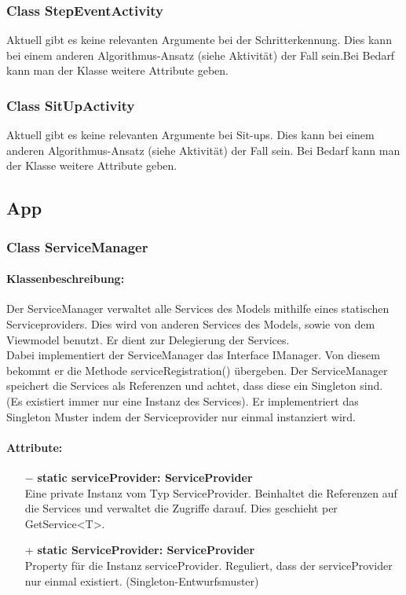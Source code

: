 \documentclass[a4paper,12pt]{article}
\begin{document}
	\subsubsection{Class StepEventActivity}
	Aktuell gibt es keine relevanten Argumente bei der Schritterkennung. Dies kann bei einem anderen Algorithmus-Ansatz (siehe Aktivität) der Fall sein.Bei Bedarf kann man der Klasse weitere Attribute geben.
	\subsubsection{Class SitUpActivity}
	Aktuell gibt es keine relevanten Argumente bei Sit-ups. Dies kann bei einem anderen Algorithmus-Ansatz (siehe Aktivität) der Fall sein. Bei Bedarf kann man der Klasse weitere Attribute geben.
	

\subsection{App}
\subsubsection{Class ServiceManager}
	\paragraph{Klassenbeschreibung:}
	Der ServiceManager verwaltet alle Services des Models mithilfe eines statischen Serviceproviders. Dies wird von anderen Services des Models, sowie von dem Viewmodel benutzt. Er dient zur Delegierung der Services.\\ 
	Dabei implementiert der ServiceManager das Interface IManager.
	Von diesem bekommt er die Methode serviceRegistration() übergeben.
	Der ServiceManager speichert die Services als Referenzen und achtet, dass diese ein Singleton sind. (Es existiert immer nur eine Instanz des Services).
	Er implementriert das Singleton Muster indem der Serviceprovider nur einmal instanziert wird.
	
	\paragraph{Attribute:}
	\begin{itemize}
		\item[$-$] \textbf{static serviceProvider: ServiceProvider}\\Eine private Instanz vom Typ ServiceProvider. Beinhaltet die Referenzen auf die Services und verwaltet die Zugriffe darauf. Dies geschieht per GetService<T>.
		\item[+] \textbf{static ServiceProvider: ServiceProvider}\\Property für die Instanz serviceProvider. Reguliert, dass der serviceProvider nur einmal existiert. (Singleton-Entwurfsmuster)

	\end{itemize}
\end{document}
